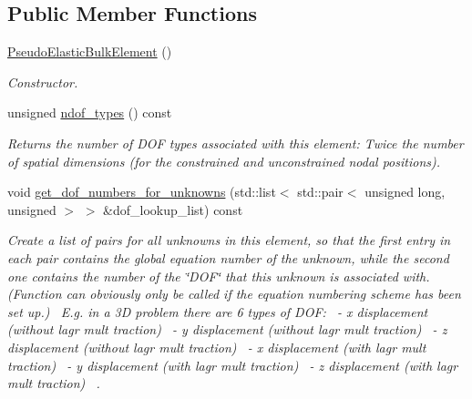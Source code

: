 \subsection*{Public Member Functions}
\begin{DoxyCompactItemize}
\item 
\hyperlink{classoomph_1_1PseudoElasticBulkElement_a38c03edd9639522e713ef9bf679d7e5a}{Pseudo\+Elastic\+Bulk\+Element} ()
\begin{DoxyCompactList}\small\item\em Constructor. \end{DoxyCompactList}\item 
unsigned \hyperlink{classoomph_1_1PseudoElasticBulkElement_a18674d52b96db8800d31e89ffd465175}{ndof\+\_\+types} () const
\begin{DoxyCompactList}\small\item\em Returns the number of D\+OF types associated with this element\+: Twice the number of spatial dimensions (for the constrained and unconstrained nodal positions). \end{DoxyCompactList}\item 
void \hyperlink{classoomph_1_1PseudoElasticBulkElement_a8f1dc2011100324953293470a18f3080}{get\+\_\+dof\+\_\+numbers\+\_\+for\+\_\+unknowns} (std\+::list$<$ std\+::pair$<$ unsigned long, unsigned $>$ $>$ \&dof\+\_\+lookup\+\_\+list) const
\begin{DoxyCompactList}\small\item\em Create a list of pairs for all unknowns in this element, so that the first entry in each pair contains the global equation number of the unknown, while the second one contains the number of the \char`\"{}\+D\+O\+F\char`\"{} that this unknown is associated with. (Function can obviously only be called if the equation numbering scheme has been set up.)~\newline
E.\+g. in a 3D problem there are 6 types of D\+OF\+:~ -\/ x displacement (without lagr mult traction)~ -\/ y displacement (without lagr mult traction)~ -\/ z displacement (without lagr mult traction)~ -\/ x displacement (with lagr mult traction)~ -\/ y displacement (with lagr mult traction)~ -\/ z displacement (with lagr mult traction)~\newline
. \end{DoxyCompactList}\end{DoxyCompactItemize}


